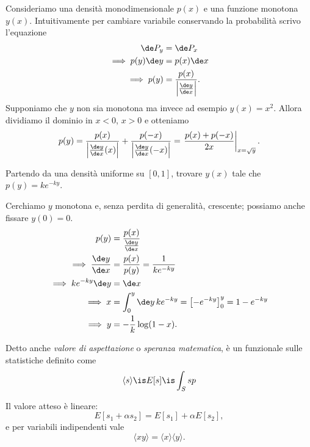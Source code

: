 \begin{es}
	\label{th:stat1d}
	Consideriamo una densità monodimensionale $p(x)$ e una funzione monotona $y(x)$.
	Intuitivamente per cambiare variabile conservando la probabilità scrivo l'equazione
	\begin{align*}
		\de P_y &= \de P_x \\
		\implies p(y)\de y &= p(x) \de x \\
		\implies p(y) &= \frac{p(x)}{\left|\frac{\de y}{\de x}\right|}.
	\end{align*}
	Supponiamo che $y$ non sia monotona ma invece ad esempio $y(x)=x^2$.
	Allora dividiamo il dominio in $x<0$, $x>0$ e otteniamo
	\begin{equation*}
		p(y) = \frac{p(x)}{\left|\frac{\de y}{\de x}(x)\right|} + \frac{p(-x)}{\left|\frac{\de y}{\de x}(-x)\right|} =
		\left.\frac{p(x)+p(-x)}{2x}\right|_{x=\sqrt y}.
	\end{equation*}
\end{es}

\begin{ex}
	Partendo da una densità uniforme su $[0,1]$,
	trovare $y(x)$ tale che $p(y) = ke^{-ky}$.
\end{ex}

\begin{solution}
	Cerchiamo $y$ monotona e, senza perdita di generalità, crescente; possiamo anche fissare $y(0) = 0$.
	\begin{align*}
		p(y) &= \frac{p(x)}{\frac{\de y}{\de x}} \\
		\implies \frac{\de y}{\de x} &= \frac{p(x)}{p(y)} = \frac{1}{ke^{-ky}}\\
		\implies ke^{-ky}\de y &= \de x \\
		\implies x &= \int_{0}^{y} \de y\, ke^{-ky} = \left[ -e^{-ky} \right]_{0}^{y} = 1 - e^{-ky} \\
		\implies y &= -\frac1k \log(1-x).
	\end{align*}
\end{solution}

\begin{defn}
	Detto anche \emph{valore di aspettazione} o \emph{speranza matematica},
	è un funzionale sulle statistiche definito come
	\begin{equation*}
		\langle s \rangle \is E[s] \is \int_S sp
	\end{equation*}
\end{defn}
Il valore atteso è lineare:
\begin{equation*}
	E[s_1+\alpha s_2] = E[s_1] + \alpha E[s_2],
\end{equation*}
e per variabili indipendenti vale
\begin{equation*}
	\langle xy \rangle = \langle x \rangle \langle y \rangle.
\end{equation*}

